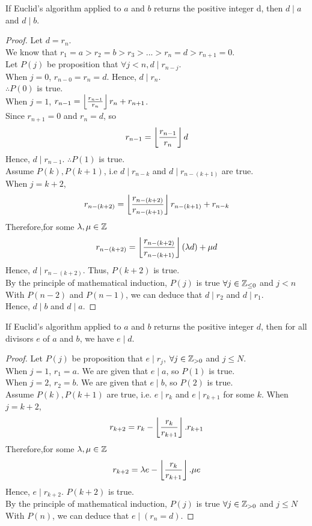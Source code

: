 \documentclass[a4paper]{article}
\begin{document}
\begin{lemma}
If Euclid’s algorithm applied to $a$ and $b$ returns the positive integer d, then $d \mid a$ and $d \mid b$.
\end{lemma}
\begin{proof}
Let $d = r_n$.\\
We know that $r_1 = a > r_2 = b > r_3 > ... > r_n = d > r_{n+1} = 0$.\\
Let $P(j)$ be proposition that $\forall j < n, d \mid r_{n-j}$.\\
When $j = 0$, $r_{n-0} = r_n = d$. Hence, $d \mid r_n$.\\
$\therefore P(0)$ is true.\\
When $j = 1$, $r_{n-1} = \left\lfloor \frac{r_{n-1}}{r_n} \right\rfloor r_n + r_{n+1}$.\\
Since $r_{n+1} = 0$ and $r_n = d$, so $$r_{n-1} = \left\lfloor \frac{r_{n-1}}{r_n} \right\rfloor d$$
Hence, $d \mid r_{n-1}$. $\therefore P(1)$ is true.\\
Assume $P(k), P(k+1)$, i.e $d \mid r_{n-k}$ and $d \mid r_{n-(k+1)}$ are true.\\
When $j = k+2$,$$r_{n-(k+2)} = \left\lfloor \frac{r_{n-(k+2)}}{r_{n-(k+1)}} \right\rfloor r_{n-(k+1)} + r_{n-k}$$
Therefore,for some $\lambda, \mu \in \mathbb{Z}$ $$r_{n-(k+2)} = \left\lfloor \frac{r_{n-(k+2)}}{r_{n-(k+1)}} \right\rfloor(\lambda d) + \mu d$$
Hence, $d \mid r_{n-(k+2)}$. Thus, $P(k+2)$ is true.\\
By the principle of mathematical induction, $P(j)$ is true $\forall j \in \mathbb{Z}_{\leq 0}$ and $j < n$\\
With $P(n-2)$ and $P(n-1)$, we can deduce that $d \mid r_{2}$ and $d \mid r_{1}$.\\
Hence, $d \mid b$ and $d \mid a$.
\end{proof}

\begin{lemma}
If Euclid’s algorithm applied to $a$ and $b$ returns the positive integer $d$, then for all divisors $e$ of $a$ and $b$, we have $e \mid d$.
\end{lemma}
\begin{proof}
Let $P(j)$ be proposition that $e \mid r_j$, $\forall j \in \mathbb{Z}_{>0}$ and $j \leq N$.\\
When $j=1$, $r_1 = a$. We are given that $e \mid a$, so $P(1)$ is true.\\
When $j=2$, $r_2 = b$. We are given that $e \mid b$, so $P(2)$ is true.\\
Assume $P(k), P(k+1)$ are true, i.e. $e \mid r_k$ and $e \mid r_{k+1}$ for some $k$.
When $j=k+2$, $$r_{k+2} = r_k - \left\lfloor \frac{r_k}{r_{k+1}} \right\rfloor . r_{k+1}$$
Therefore,for some $\lambda, \mu \in \mathbb{Z}$ $$r_{k+2} = \lambda e - \left\lfloor \frac{r_k}{r_{k+1}} \right\rfloor . \mu e$$
Hence, $e \mid r_{k+2}$. $P(k+2)$ is true.\\
By the principle of mathematical induction, $P(j)$ is true $\forall j \in \mathbb{Z}_{>0}$ and $j \leq N$\\
With $P(n)$, we can deduce that $e \mid (r_n = d)$.
\end{proof}
\end{document}

